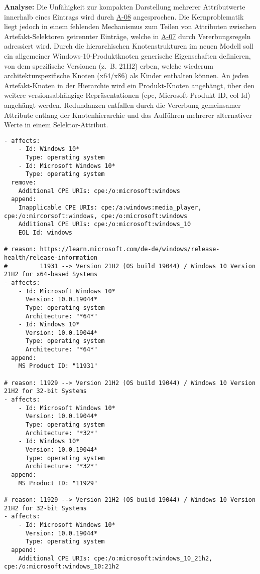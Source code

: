 \textbf{Analyse:}
Die Unfähigkeit zur kompakten Darstellung mehrerer Attributwerte innerhalb eines Eintrags wird durch \hyperref[subsec:req-multiple-attribute-values]{A-08} angesprochen.
Die Kernproblematik liegt jedoch in einem fehlenden Mechanismus zum Teilen von Attributen zwischen Artefakt-Selektoren getrennter Einträge, welche in \hyperref[subsec:req-selektor-inheritance]{A-07} durch Vererbungsregeln adressiert wird.
Durch die hierarchischen Knotenstrukturen im neuen Modell soll ein allgemeiner Windows-10-Produktknoten generische Eigenschaften definieren, von dem spezifische Versionen (z.\ B. 21H2) erben, welche wiederum architekturspezifische Knoten (x64/x86) als Kinder enthalten können.
An jeden Artefakt-Knoten in der Hierarchie wird ein Produkt-Knoten angehängt, über den weitere versionsabhängige Repräsentationen (\acrshort{cpe}, Microsoft-Produkt-ID, \acrshort{eol}-Id) angehängt werden.
Redundanzen entfallen durch die Vererbung gemeinsamer Attribute entlang der Knotenhierarchie und das Aufführen mehrerer alternativer Werte in einem Selektor-Attribut.

\begin{lstlisting}[style=yaml,caption={Windows-Korrelation mit mehreren Identifikatoren},label={lst:reference-case-windows},basicstyle=\ttfamily\scriptsize]
- affects:
    - Id: Windows 10*
      Type: operating system
    - Id: Microsoft Windows 10*
      Type: operating system
  remove:
    Additional CPE URIs: cpe:/o:microsoft:windows
  append:
    Inapplicable CPE URIs: cpe:/a:windows:media_player, cpe:/o:mircorsoft:windows, cpe:/o:microsoft:windows
    Additional CPE URIs: cpe:/o:microsoft:windows_10
    EOL Id: windows

# reason: https://learn.microsoft.com/de-de/windows/release-health/release-information
#         11931 --> Version 21H2 (OS build 19044) / Windows 10 Version 21H2 for x64-based Systems
- affects:
    - Id: Microsoft Windows 10*
      Version: 10.0.19044*
      Type: operating system
      Architecture: "*64*"
    - Id: Windows 10*
      Version: 10.0.19044*
      Type: operating system
      Architecture: "*64*"
  append:
    MS Product ID: "11931"

# reason: 11929 --> Version 21H2 (OS build 19044) / Windows 10 Version 21H2 for 32-bit Systems
- affects:
    - Id: Microsoft Windows 10*
      Version: 10.0.19044*
      Type: operating system
      Architecture: "*32*"
    - Id: Windows 10*
      Version: 10.0.19044*
      Type: operating system
      Architecture: "*32*"
  append:
    MS Product ID: "11929"

# reason: 11929 --> Version 21H2 (OS build 19044) / Windows 10 Version 21H2 for 32-bit Systems
- affects:
    - Id: Microsoft Windows 10*
      Version: 10.0.19044*
      Type: operating system
  append:
    Additional CPE URIs: cpe:/o:microsoft:windows_10_21h2, cpe:/o:microsoft:windows_10:21h2
\end{lstlisting}
